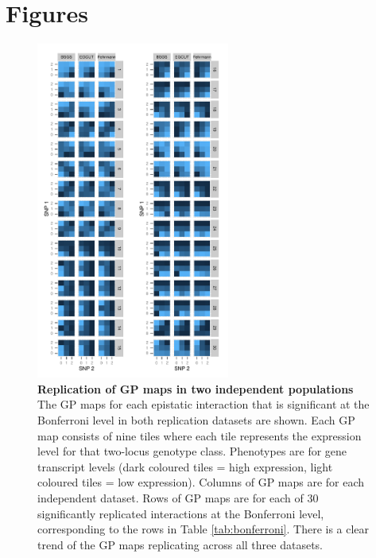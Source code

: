 \documentclass{article}
\begin{document}
\clearpage
\section{Figures}

\begin{figure}[H]
	\centering
	\includegraphics[width=2.5in]{gpbonfrep.pdf}
	\caption{\textbf{Replication of GP maps in two independent populations} The GP maps for each epistatic interaction that is significant at the Bonferroni level in both replication datasets are shown. Each GP map consists of nine tiles where each tile represents the expression level for that two-locus genotype class. Phenotypes are for gene transcript levels (dark coloured tiles = high expression, light coloured tiles = low expression). Columns of GP maps are for each independent dataset. Rows of GP maps are for each of 30 significantly replicated interactions at the Bonferroni level, corresponding to the rows in Table \ref{tab:bonferroni}. There is a clear trend of the GP maps replicating across all three datasets.}
	\label{fig:gpmaps}
\end{figure}
\clearpage
\end{document}
